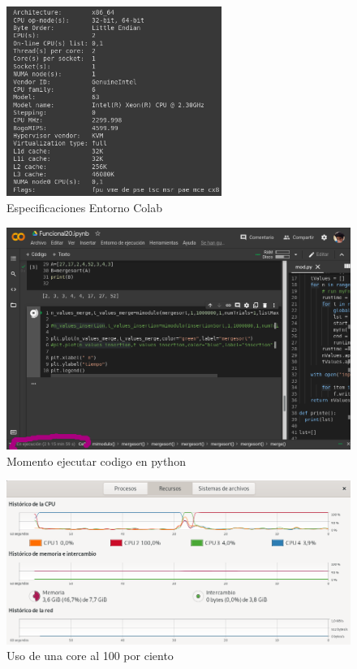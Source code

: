 \documentclass[a4paper]{article}
\begin{document}
\begin{figure}[H]%
\centering
\includegraphics[width=7cm]{imagenes/arquitectura2.png}
\caption{Especificaciones Entorno Colab}
\end{figure}


\begin{figure}[H]%
\centering
\includegraphics[width=14cm]{imagenes/cap.png}
\caption{Momento ejecutar codigo en python }
\end{figure}

\begin{figure}[H]%
\centering
\includegraphics[width=13cm]{imagenes/cpus.png}
\caption{Uso de una core al 100 por ciento}
\end{figure}
\end{document}
